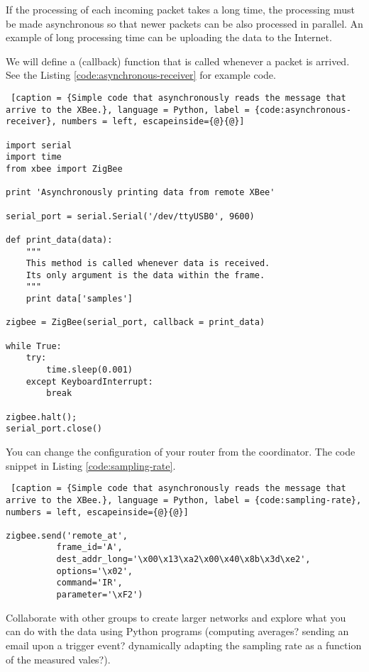If the processing of each incoming packet takes a long time, the processing must be made asynchronous so that newer packets can be also processed in parallel.
An example of long processing time can be uploading the data to the Internet.

We will define a (callback) function that is called whenever a packet is arrived.
See the Listing \ref{code:asynchronous-receiver} for example code.

\begin{lstlisting} [caption = {Simple code that asynchronously reads the message that arrive to the XBee.}, language = Python, label = {code:asynchronous-receiver}, numbers = left, escapeinside={@}{@}]

import serial
import time
from xbee import ZigBee

print 'Asynchronously printing data from remote XBee'

serial_port = serial.Serial('/dev/ttyUSB0', 9600)

def print_data(data):
    """
    This method is called whenever data is received.
    Its only argument is the data within the frame.
    """
    print data['samples']

zigbee = ZigBee(serial_port, callback = print_data)

while True:
    try:
        time.sleep(0.001)
    except KeyboardInterrupt:
        break

zigbee.halt();
serial_port.close()

\end{lstlisting}

You can change the configuration of your router from the coordinator. 
The code snippet in Listing \ref{code:sampling-rate}.

\begin{lstlisting} [caption = {Simple code that asynchronously reads the message that arrive to the XBee.}, language = Python, label = {code:sampling-rate}, numbers = left, escapeinside={@}{@}]

zigbee.send('remote_at',
          frame_id='A',
          dest_addr_long='\x00\x13\xa2\x00\x40\x8b\x3d\xe2',
          options='\x02',
          command='IR',
          parameter='\xF2')

\end{lstlisting}

Collaborate with other groups to create larger networks and explore what you can do with the data using Python programs (computing averages? sending an email upon a trigger event? dynamically adapting the sampling rate as a function of the measured vales?).

